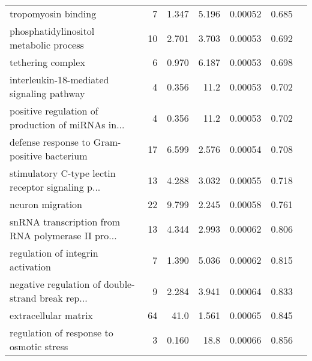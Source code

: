 \begin{longtable}{|l|r|r|r|r|r|}
                               tropomyosin binding &                       7 &                   1.347 &      5.196 &              0.00052 &                        0.685~~ \\
            phosphatidylinositol metabolic process &                      10 &                   2.701 &      3.703 &              0.00053 &                        0.692~~ \\
                                 tethering complex &                       6 &                   0.970 &      6.187 &              0.00053 &                        0.698~~ \\
         interleukin-18-mediated signaling pathway &                       4 &                   0.356 &       11.2 &              0.00053 &                        0.702~~ \\
 positive regulation of production of miRNAs in... &                       4 &                   0.356 &       11.2 &              0.00053 &                        0.702~~ \\
       defense response to Gram-positive bacterium &                      17 &                   6.599 &      2.576 &              0.00054 &                        0.708~~ \\
 stimulatory C-type lectin receptor signaling p... &                      13 &                   4.288 &      3.032 &              0.00055 &                        0.718~~ \\
                                  neuron migration &                      22 &                   9.799 &      2.245 &              0.00058 &                        0.761~~ \\
 snRNA transcription from RNA polymerase II pro... &                      13 &                   4.344 &      2.993 &              0.00062 &                        0.806~~ \\
                 regulation of integrin activation &                       7 &                   1.390 &      5.036 &              0.00062 &                        0.815~~ \\
 negative regulation of double-strand break rep... &                       9 &                   2.284 &      3.941 &              0.00064 &                        0.833~~ \\
                              extracellular matrix &                      64 &                    41.0 &      1.561 &              0.00065 &                        0.845~~ \\
          regulation of response to osmotic stress &                       3 &                   0.160 &       18.8 &              0.00066 &                        0.856~~ \\
\end{longtable}
